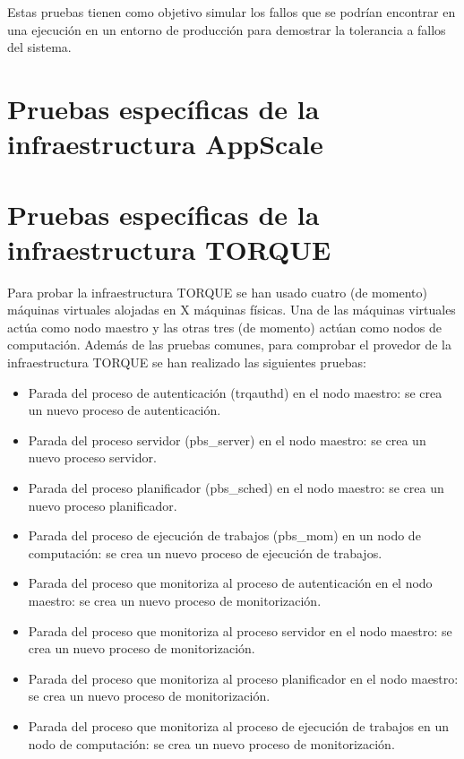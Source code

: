 Estas pruebas tienen como objetivo simular los fallos que se podrían encontrar en una ejecución en un entorno de producción para demostrar la tolerancia a fallos del sistema.


\section{Pruebas específicas de la infraestructura AppScale}


\section{Pruebas específicas de la infraestructura TORQUE}

Para probar la infraestructura TORQUE se han usado cuatro (de momento) máquinas virtuales alojadas en X máquinas físicas. Una de las máquinas virtuales actúa como nodo maestro y las otras tres (de momento) actúan como nodos de computación. Además de las pruebas comunes, para comprobar el provedor de la infraestructura TORQUE se han realizado las siguientes pruebas:

\begin{itemize}
\item Parada del proceso de autenticación (trqauthd) en el nodo maestro: se crea un nuevo proceso de autenticación.
\item Parada del proceso servidor (pbs\_server) en el nodo maestro: se crea un nuevo proceso servidor.
\item Parada del proceso planificador (pbs\_sched) en el nodo maestro: se crea un nuevo proceso planificador.
\item Parada del proceso de ejecución de trabajos (pbs\_mom) en un nodo de computación: se crea un nuevo proceso de ejecución de trabajos.
\item Parada del proceso que monitoriza al proceso de autenticación en el nodo maestro: se crea un nuevo proceso de monitorización.
\item Parada del proceso que monitoriza al proceso servidor en el nodo maestro: se crea un nuevo proceso de monitorización.
\item Parada del proceso que monitoriza al proceso planificador en el nodo maestro: se crea un nuevo proceso de monitorización.
\item Parada del proceso que monitoriza al proceso de ejecución de trabajos en un nodo de computación: se crea un nuevo proceso de monitorización.
\end{itemize}


